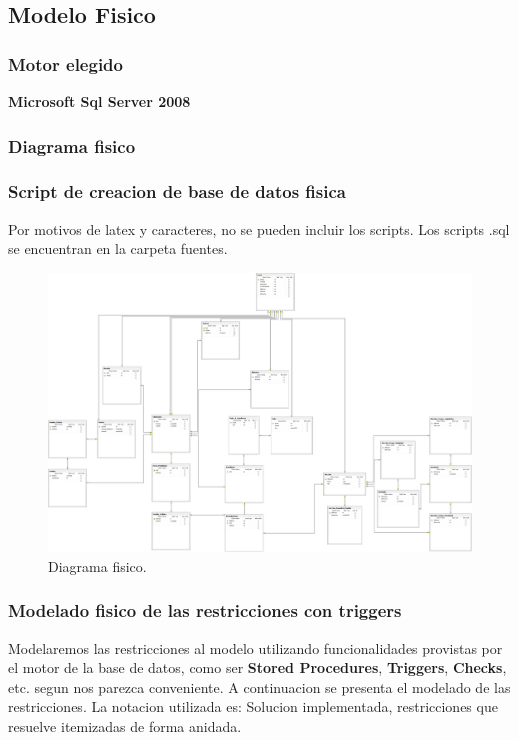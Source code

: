 \subsection{Modelo Fisico}
\subsubsection{Motor elegido}

\textbf{Microsoft Sql Server 2008}

\subsubsection{Diagrama fisico}
\subsubsection{Script de creacion de base de datos fisica}
Por motivos de latex y caracteres, no se pueden incluir los scripts. Los scripts .sql se encuentran en la carpeta fuentes.

\begin{landscape}
	\begin{figure}[t]
	  \centering	
		\includegraphics[scale=0.35]{fig/modelo-fisico.png}
	  \caption{Diagrama fisico.}
	\end{figure}
\end{landscape}

\subsubsection{Modelado fisico de las restricciones con triggers}
Modelaremos las restricciones al modelo utilizando funcionalidades provistas por el motor de la base de datos, como ser \textbf{Stored Procedures}, \textbf{Triggers}, \textbf{Checks}, etc. segun nos parezca conveniente. A continuacion se presenta el modelado de las restricciones. La notacion utilizada es: Solucion implementada, restricciones que resuelve itemizadas de forma anidada. 

